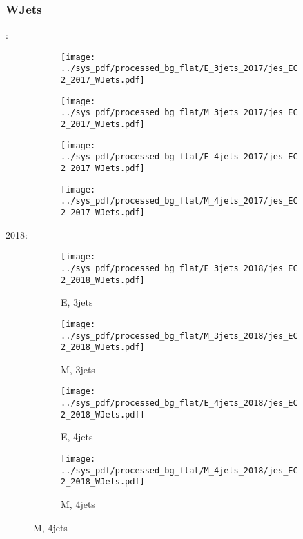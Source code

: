 \documentclass{beamer}
\begin{document}
\begin{frame}
\frametitle{WJets}
\fontsize{5}{1}:
\begin{figure}
\centering
\begin{subfigure}[b]{0.24\textwidth}
\texttt{[image: ../sys\_pdf/processed\_bg\_flat/E\_3jets\_2017/jes\_EC2\_2017\_WJets.pdf]}
\end{subfigure}
\begin{subfigure}[b]{0.24\textwidth}
\texttt{[image: ../sys\_pdf/processed\_bg\_flat/M\_3jets\_2017/jes\_EC2\_2017\_WJets.pdf]}
\end{subfigure}
\begin{subfigure}[b]{0.24\textwidth}
\texttt{[image: ../sys\_pdf/processed\_bg\_flat/E\_4jets\_2017/jes\_EC2\_2017\_WJets.pdf]}
\end{subfigure}
\begin{subfigure}[b]{0.24\textwidth}
\texttt{[image: ../sys\_pdf/processed\_bg\_flat/M\_4jets\_2017/jes\_EC2\_2017\_WJets.pdf]}
\end{subfigure}
\end{figure}
2018:
\begin{figure}
\centering
\begin{subfigure}[b]{0.24\textwidth}
\texttt{[image: ../sys\_pdf/processed\_bg\_flat/E\_3jets\_2018/jes\_EC2\_2018\_WJets.pdf]}
\captionsetup{font=tiny}
\caption{E, 3jets}
\end{subfigure}
\begin{subfigure}[b]{0.24\textwidth}
\texttt{[image: ../sys\_pdf/processed\_bg\_flat/M\_3jets\_2018/jes\_EC2\_2018\_WJets.pdf]}
\captionsetup{font=tiny}
\caption{M, 3jets}
\end{subfigure}
\begin{subfigure}[b]{0.24\textwidth}
\texttt{[image: ../sys\_pdf/processed\_bg\_flat/E\_4jets\_2018/jes\_EC2\_2018\_WJets.pdf]}
\captionsetup{font=tiny}
\caption{E, 4jets}
\end{subfigure}
\begin{subfigure}[b]{0.24\textwidth}
\texttt{[image: ../sys\_pdf/processed\_bg\_flat/M\_4jets\_2018/jes\_EC2\_2018\_WJets.pdf]}
\captionsetup{font=tiny}
\caption{M, 4jets}
\end{subfigure}
\end{figure}
\end{frame}
\end{document}
